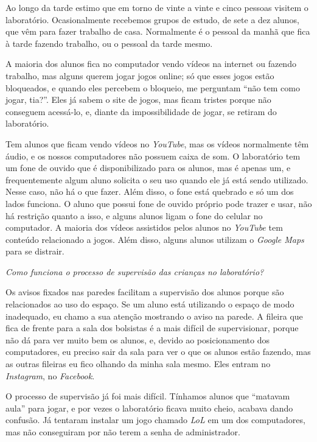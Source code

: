 Ao longo da tarde estimo que em torno de vinte a vinte e cinco pessoas visitem o laboratório. Ocasionalmente recebemos grupos de estudo, de sete a dez alunos, que vêm para fazer trabalho de casa. Normalmente é o pessoal da manhã que fica à tarde fazendo trabalho, ou o pessoal da tarde mesmo.

A maioria dos alunos fica no computador vendo vídeos na internet ou fazendo trabalho, mas alguns querem jogar jogos online; só que esses jogos estão bloqueados, e quando eles percebem o bloqueio, me perguntam “não tem como jogar, tia?”. Eles já sabem o site de jogos, mas ficam tristes porque não conseguem acessá-lo, e, diante da impossibilidade de jogar, se retiram do laboratório.

Tem alunos que ficam vendo vídeos no \textit{YouTube}, mas os vídeos normalmente têm áudio, e os nossos computadores não possuem caixa de som. O laboratório tem um fone de ouvido que é disponibilizado para os alunos, mas é apenas um, e frequentemente algum aluno solicita o seu uso quando ele já está sendo utilizado. Nesse caso, não há o que fazer. Além disso, o fone está quebrado e só um dos lados funciona. O aluno que possui fone de ouvido próprio pode trazer e usar, não há restrição quanto a isso, e alguns alunos ligam o fone do celular no computador. A maioria dos vídeos assistidos pelos alunos no \textit{YouTube} tem conteúdo relacionado a jogos. Além disso, alguns alunos utilizam o \textit{Google Maps} para se distrair.

\textit{Como funciona o processo de supervisão das crianças no laboratório?}

Os avisos fixados nas paredes facilitam a supervisão dos alunos porque são relacionados ao uso do espaço. Se um aluno está utilizando o espaço de modo inadequado, eu chamo a sua atenção mostrando o aviso na parede. A fileira que fica de frente para a sala dos bolsistas é a mais difícil de supervisionar, porque não dá para ver muito bem os alunos, e, devido ao posicionamento dos computadores, eu preciso sair da sala para ver o que os alunos estão fazendo, mas as outras fileiras eu fico olhando da minha sala mesmo. Eles entram no \textit{Instagram}, no \textit{Facebook}.

O processo de supervisão já foi mais difícil. Tínhamos alunos que “matavam aula” para jogar, e por vezes o laboratório ficava muito cheio, acabava dando confusão. Já tentaram instalar um jogo chamado \textit{LoL} em um dos computadores, mas não conseguiram por não terem a senha de administrador.

